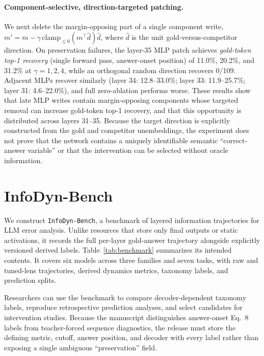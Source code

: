 \documentclass{article} %
\begin{document}
\paragraph{Component-selective, direction-targeted patching.}
We next delete the margin-opposing part of a single component write,
$m'=m-\gamma\,\mathrm{clamp}_{\le0}(m^\top\hat d)\hat d$,
where $\hat d$ is the unit gold-versus-competitor direction. On preservation failures, the layer-35 MLP patch achieves \emph{gold-token top-1 recovery} (single forward pass, answer-onset position) of 11.0\%, 20.2\%, and 31.2\% at $\gamma=1,2,4$, while an orthogonal random direction recovers 0/109. Adjacent MLPs recover similarly (layer 34: 12.8--33.0\%; layer 33: 11.9--25.7\%; layer 31: 4.6--22.0\%), and full zero-ablation performs worse. These results show that late MLP writes contain margin-opposing components whose targeted removal can increase gold-token top-1 recovery, and that this opportunity is distributed across layers 31--35. Because the target direction is explicitly constructed from the gold and competitor unembeddings, the experiment does not prove that the network contains a uniquely identifiable semantic ``correct-answer variable'' or that the intervention can be selected without oracle information.

\section{InfoDyn-Bench}

We construct \texttt{InfoDyn-Bench}, a benchmark of layered information trajectories for LLM error analysis. Unlike resources that store only final outputs or static activations, it records the full per-layer gold-answer trajectory alongside explicitly versioned derived labels. Table~\ref{tab:benchmark} summarizes its intended contents. It covers six models across three families and seven tasks, with raw and tuned-lens trajectories, derived dynamics metrics, taxonomy labels, and prediction splits.

Researchers can use the benchmark to compare decoder-dependent taxonomy labels, reproduce retrospective prediction analyses, and select candidates for intervention studies. Because the manuscript distinguishes answer-onset Eq.~8 labels from teacher-forced sequence diagnostics, the release must store the defining metric, cutoff, answer position, and decoder with every label rather than exposing a single ambiguous ``preservation'' field.

\end{document}
